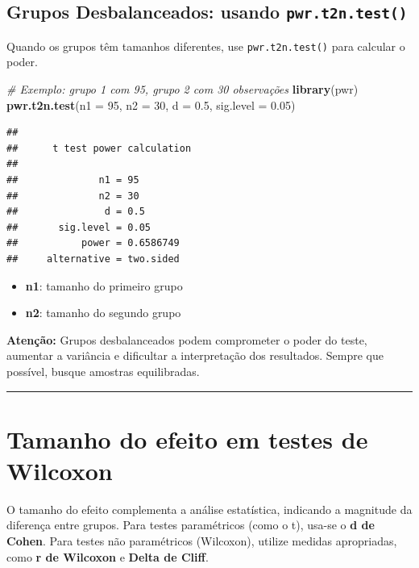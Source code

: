 \documentclass[
]{book}
\newenvironment{Shaded}{\begin{snugshade}}{\end{snugshade}}
\newcommand{\AttributeTok}[1]{\textcolor[rgb]{0.13,0.29,0.53}{#1}}
\newcommand{\CommentTok}[1]{\textcolor[rgb]{0.56,0.35,0.01}{\textit{#1}}}
\newcommand{\DecValTok}[1]{\textcolor[rgb]{0.00,0.00,0.81}{#1}}
\newcommand{\FloatTok}[1]{\textcolor[rgb]{0.00,0.00,0.81}{#1}}
\newcommand{\FunctionTok}[1]{\textcolor[rgb]{0.13,0.29,0.53}{\textbf{#1}}}
\newcommand{\NormalTok}[1]{#1}
\providecommand{\tightlist}{%
  \setlength{\itemsep}{0pt}\setlength{\parskip}{0pt}}
\begin{document}
\subsection{\texorpdfstring{Grupos Desbalanceados: usando \texttt{pwr.t2n.test()}}{Grupos Desbalanceados: usando pwr.t2n.test()}}\label{grupos-desbalanceados-usando-pwr.t2n.test}

Quando os grupos têm tamanhos diferentes, use \texttt{pwr.t2n.test()} para calcular o poder.

\begin{Shaded}
\begin{Highlighting}[]
\CommentTok{\# Exemplo: grupo 1 com 95, grupo 2 com 30 observações}
\FunctionTok{library}\NormalTok{(pwr)}
\FunctionTok{pwr.t2n.test}\NormalTok{(}\AttributeTok{n1 =} \DecValTok{95}\NormalTok{, }\AttributeTok{n2 =} \DecValTok{30}\NormalTok{, }\AttributeTok{d =} \FloatTok{0.5}\NormalTok{, }\AttributeTok{sig.level =} \FloatTok{0.05}\NormalTok{)}
\end{Highlighting}
\end{Shaded}

\begin{verbatim}
## 
##      t test power calculation 
## 
##              n1 = 95
##              n2 = 30
##               d = 0.5
##       sig.level = 0.05
##           power = 0.6586749
##     alternative = two.sided
\end{verbatim}

\begin{itemize}
\tightlist
\item
  \textbf{n1}: tamanho do primeiro grupo
\item
  \textbf{n2}: tamanho do segundo grupo
\end{itemize}

\textbf{Atenção:} Grupos desbalanceados podem comprometer o poder do teste, aumentar a variância e dificultar a interpretação dos resultados. Sempre que possível, busque amostras equilibradas.

\begin{center}\rule{0.5\linewidth}{0.5pt}\end{center}

\section{Tamanho do efeito em testes de Wilcoxon}\label{tamanho-do-efeito-em-testes-de-wilcoxon}

O tamanho do efeito complementa a análise estatística, indicando a magnitude da diferença entre grupos. Para testes paramétricos (como o t), usa-se o \textbf{d de Cohen}. Para testes não paramétricos (Wilcoxon), utilize medidas apropriadas, como \textbf{r de Wilcoxon} e \textbf{Delta de Cliff}.
\end{document}
